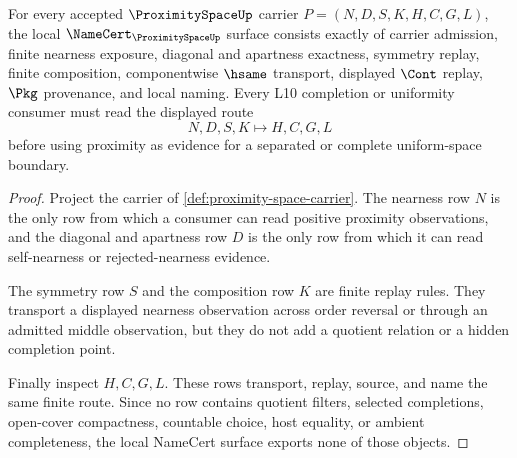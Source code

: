 \begin{theorem}
\label{thm:proximity-space-namecert-obligations}
For every accepted $\ProximitySpaceUp$ carrier $P=(N,D,S,K,H,C,G,L)$, the local $\NameCert_{\ProximitySpaceUp}$ surface consists exactly of carrier admission, finite nearness exposure, diagonal and apartness exactness, symmetry replay, finite composition, componentwise $\hsame$ transport, displayed $\Cont$ replay, $\Pkg$ provenance, and local naming. Every L10 completion or uniformity consumer must read the displayed route
$$
N,D,S,K \longmapsto H,C,G,L
$$
before using proximity as evidence for a separated or complete uniform-space boundary.
\end{theorem}
\begin{proof}
Project the carrier of \autoref{def:proximity-space-carrier}. The nearness row $N$ is the only row from which a consumer can read positive proximity observations, and the diagonal and apartness row $D$ is the only row from which it can read self-nearness or rejected-nearness evidence.

The symmetry row $S$ and the composition row $K$ are finite replay rules. They transport a displayed nearness observation across order reversal or through an admitted middle observation, but they do not add a quotient relation or a hidden completion point.

Finally inspect $H,C,G,L$. These rows transport, replay, source, and name the same finite route. Since no row contains quotient filters, selected completions, open-cover compactness, countable choice, host equality, or ambient completeness, the local NameCert surface exports none of those objects.
\end{proof}

